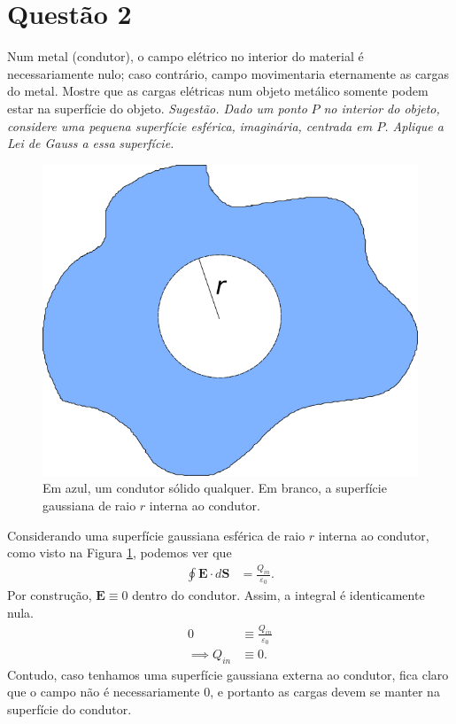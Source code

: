 \documentclass[11pt]{article}
\begin{document}
\section{Questão 2}
\label{sec:org35731ff}
Num metal (condutor), o campo elétrico no interior do material é
necessariamente nulo; caso contrário, campo movimentaria eternamente as
cargas do metal. Mostre que as cargas elétricas num objeto metálico
somente podem estar na superfície do objeto. \emph{Sugestão. Dado um ponto}
\emph{\(P\) no interior do objeto, considere uma pequena superfície esférica,}
\emph{imaginária, centrada em \(P\). Aplique a Lei de Gauss a essa}
\emph{superfície.}

\begin{figure}[h!]
  \centering
  \includegraphics[scale=0.3]{imagens/ex-2.png}
  \caption{Em azul, um condutor sólido qualquer. Em branco, a
    superfície gaussiana de raio $r$ interna ao condutor. }
  \label{fig:ex-2}
\end{figure}

Considerando uma superfície gaussiana esférica de raio \(r\) interna ao
condutor, como visto na Figura \ref{fig:ex-2}, podemos ver que 
\begin{align*}
  \oint \mathbf E\cdot d\mathbf S &= \frac{Q_{in}}{\varepsilon_0}.
\end{align*}
Por construção, $\mathbf E \equiv 0$ dentro do condutor. Assim, a integral
é identicamente nula. 
\begin{align*}
  0 &\equiv \frac{Q_{in}}{\varepsilon_0}\\
  \implies Q_{in} &\equiv 0.
\end{align*}
Contudo, caso tenhamos uma superfície gaussiana externa ao condutor,
fica claro que o campo não é necessariamente \(0\), e portanto as cargas
devem se manter na superfície do condutor. 
\end{document}
